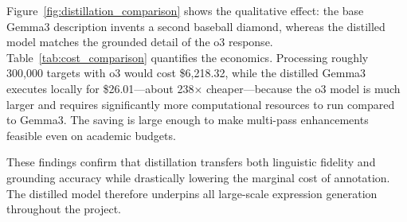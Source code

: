 Figure~\ref{fig:distillation_comparison} shows the qualitative effect: the base Gemma3 description invents a second baseball diamond, whereas the distilled model matches the grounded detail of the o3 response. Table~\ref{tab:cost_comparison} quantifies the economics. Processing roughly 300{,}000 targets with o3 would cost \$6{,}218.32, while the distilled Gemma3 executes locally for \$26.01—about 238× cheaper—because the o3 model is much larger and requires significantly more computational resources to run compared to Gemma3. The saving is large enough to make multi-pass enhancements feasible even on academic budgets.

These findings confirm that distillation transfers both linguistic fidelity and grounding accuracy while drastically lowering the marginal cost of annotation. The distilled model therefore underpins all large-scale expression generation throughout the project.

